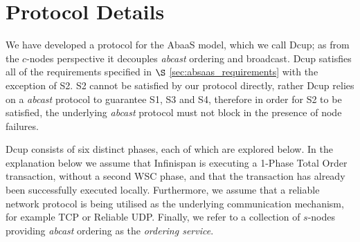\section{Protocol Details}\label{sec:decoupled_protocol}
We have developed a protocol for the \textsf{AbaaS} model, which we call \textsf{Dcup}; as from the $c$-nodes perspective it decouples \emph{abcast} ordering and broadcast.  \textsf{Dcup} satisfies all of the requirements specified in $\S$ \ref{sec:absaas_requirements} with the exception of S2.  S2 cannot be satisfied by our protocol directly, rather \textsf{Dcup} relies on a \emph{abcast} protocol to guarantee S1, S3 and S4, therefore in order for S2 to be satisfied, the underlying \emph{abcast} protocol must not block in the presence of node failures.  

\textsf{Dcup} consists of six distinct phases, each of which are explored below.  In the explanation below we assume that Infinispan is executing a 1-Phase Total Order transaction, without a second WSC phase, and that the transaction has already been successfully executed locally.  Furthermore, we assume that a reliable network protocol is being utilised as the underlying communication mechanism, for example TCP\citep{Cerf:2005:PPN:1064413.1064423} or Reliable UDP\citep{ReliableUDP}.  Finally, we refer to a collection of $s$-nodes providing \emph{abcast} ordering as the \emph{ordering service}.  

